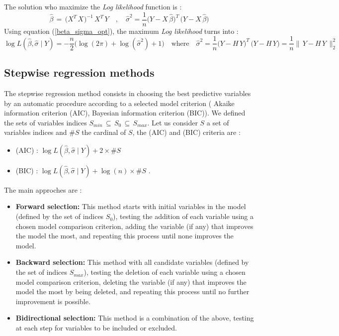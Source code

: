 The solution who maximize the {\it Log likelihood} function is :
\begin{equation}
\label{beta_sigma_opt}
  \hat{\beta} \,=\, \big(X^T_{} \,X_{}\big)^{-1} \,X^T \, Y
\quad,\quad 
\hat{\sigma}^2 = \frac{1}{n}\big(Y-X \,\hat{\beta}\big)^T\,\big(Y-X \,\hat{\beta}\big)
\end{equation}
Using equation (\ref{beta_sigma_opt}), the maximum {\it Log likelihood} turns into :
\begin{equation}
\log L(\hat{\beta},\hat{\sigma}\mid Y)=-\frac{n}{2}\big(\log(2\pi)+ \log(\hat{\sigma}^2)+1\big)
\quad \text{where} \quad
\hat{\sigma}^2 = \frac{1}{n}\big(Y-H\,Y\big)^T\,\big(Y-H\,Y \big)=\frac{1}{n}\|\,Y-H\,Y\,\|^2_2
\end{equation}

\subsection{Stepwise regression methods}

The stepwise regression method consists in choosing the best predictive variables by an automatic procedure
 according to a selected model criterion ( Akaike information criterion (AIC), Bayesian information criterion (BIC)).
We defined the sets of variables indices $ S_{min}\,\subseteq\, S_0\,\subseteq\, S_{max}$. 
Let us consider $S$ a set of variables indices and $\# S$ the cardinal of $S$, the (AIC) and (BIC) criteria are :  

\begin{itemize}
\item (AIC) : $\log L(\hat{\beta},\hat{\sigma}\mid Y) + 2 \times \# S $  
\item (BIC) : $\log L(\hat{\beta},\hat{\sigma}\mid Y) + \log(n) \times \# S $ .
\end{itemize}

The main approches are : 
\begin{itemize}
\item {\bf Forward selection:} This method starts with initial variables in the model 
(defined by the set of indices $S_0$), testing the addition of each variable using a chosen model comparison criterion,
 adding the variable (if any) that improves the model the most, and repeating this process until none improves the model.\\
\item {\bf Backward selection:} This method  with all candidate variables 
(defined by the set of indices $S_{max}$), testing the deletion of each variable using a chosen model comparison criterion,
 deleting the variable (if any) that improves the model the most by being deleted, and repeating this process until no further improvement is possible.\\
\item {\bf Bidirectional selection:} This method is a combination of the above, testing at each step for variables to be included or excluded.
\end{itemize}


